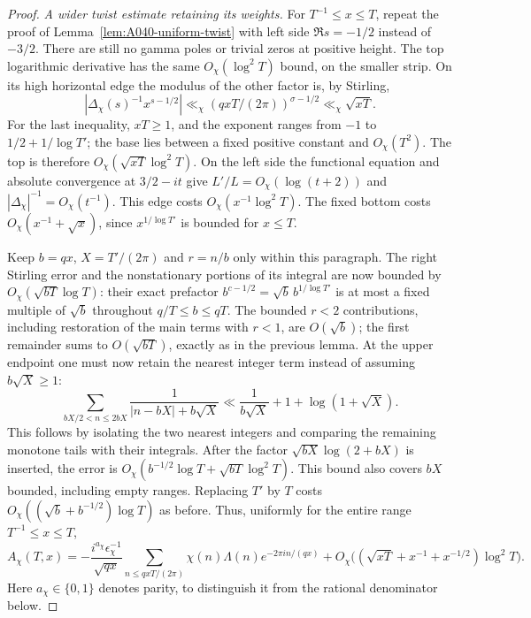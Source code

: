 \begin{proof}
\emph{A wider twist estimate retaining its weights.}
For $T^{-1}\le x\le T$, repeat the proof of
Lemma~\ref{lem:A040-uniform-twist} with left side
$\Re s=-1/2$ instead of $-3/2$. There are still no gamma poles
or trivial zeros at positive height. The top logarithmic
derivative has the same $O_\chi(\log^2T)$ bound, on the smaller
strip. On its high horizontal edge the modulus of the other
factor is, by Stirling,
\[
 |\Delta_\chi(s)^{-1}x^{s-1/2}|
                \ll_\chi(qxT/(2\pi))^{\sigma-1/2}
                \ll_\chi\sqrt{xT}.
\]
For the last inequality, $xT\ge1$, and the exponent ranges
from $-1$ to $1/2+1/\log T'$; the base lies between a fixed
positive constant and $O_\chi(T^2)$. The top is therefore
$O_\chi(\sqrt{xT}\log^2T)$. On the left side the functional
equation and absolute convergence at $3/2-it$ give
$L'/L=O_\chi(\log(t+2))$ and
$|\Delta_\chi|^{-1}=O_\chi(t^{-1})$. This edge costs
$O_\chi(x^{-1}\log^2T)$. The fixed bottom costs
$O_\chi(x^{-1}+\sqrt x)$, since
$x^{1/\log T'}$ is bounded for $x\le T$.

Keep $b=qx$, $X=T'/(2\pi)$ and $r=n/b$ only within this
paragraph. The right Stirling error and the nonstationary
portions of its integral are now bounded by
$O_\chi(\sqrt{bT}\log T)$: their exact prefactor
$b^{c-1/2}=\sqrt b\,b^{1/\log T'}$ is at most a fixed
multiple of $\sqrt b$ throughout $q/T\le b\le qT$.
The bounded $r<2$ contributions, including restoration of
the main terms with $r<1$, are $O(\sqrt b)$; the first
remainder sums to $O(\sqrt{bT})$, exactly as in the previous
lemma. At the upper endpoint one must now retain the nearest
integer term instead of assuming $b\sqrt X\ge1$:
\[
 \sum_{bX/2<n\le2bX}\frac1{|n-bX|+b\sqrt X}
     \ll\frac1{b\sqrt X}
                 +1+\log(1+\sqrt X).
\]
This follows by isolating the two nearest integers and comparing
the remaining monotone tails with their integrals. After the
factor $\sqrt{bX}\log(2+bX)$ is inserted, the error is
$O_\chi(b^{-1/2}\log T+\sqrt{bT}\log^2T)$.
This bound also covers $bX$ bounded, including empty ranges.
Replacing $T'$ by $T$ costs
$O_\chi((\sqrt b+b^{-1/2})\log T)$ as before. Thus, uniformly
for the entire range $T^{-1}\le x\le T$,
\begin{equation}\label{eq:A040-weighted-twist}
 A_\chi(T,x)=
 -\frac{i^{a_\chi}\epsilon_\chi^{-1}}{\sqrt{qx}}
 \sum_{n\le qxT/(2\pi)}\chi(n)\Lambda(n)e^{-2\pi in/(qx)}
 +O_\chi\bigl((\sqrt{xT}+x^{-1}+x^{-1/2})\log^2T\bigr).
\end{equation}
Here $a_\chi\in\{0,1\}$ denotes parity, to distinguish it
from the rational denominator below.


\end{proof}
